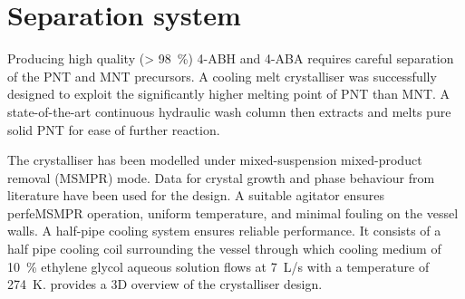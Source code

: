 \section*{Separation system}

Producing high quality (\SI{> 98}{\percent}) 4-ABH and 4-ABA requires careful separation of the PNT and MNT precursors. A cooling melt crystalliser was successfully designed to exploit the significantly higher melting point of PNT than MNT. A state-of-the-art continuous hydraulic wash column then extracts and melts pure solid PNT for ease of further reaction. 


The crystalliser has been modelled under mixed-suspension mixed-product removal (MSMPR) mode. Data for crystal growth and phase behaviour from literature have been used for the design. A suitable agitator ensures perfeMSMPR operation, uniform temperature, and minimal fouling on the vessel walls. A half-pipe cooling system ensures reliable performance. It consists of a half pipe cooling coil surrounding the vessel through which cooling medium of \SI{10}{\percent} ethylene glycol aqueous solution flows at \SI{7}{L/s} with a temperature of \SI{274}{K}.  provides a 3D overview of the crystalliser design.


